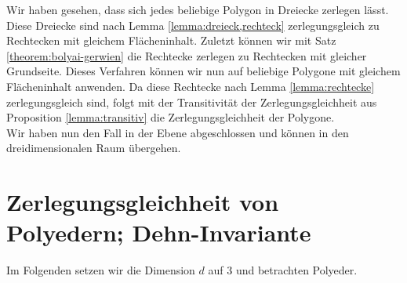 \documentclass[11pt,titlepage]{article}
\theoremstyle{definition}
\theoremstyle{remark}
\begin{document}
	Wir haben gesehen, dass sich jedes beliebige Polygon in Dreiecke zerlegen lässt. Diese Dreiecke 
	sind nach Lemma \ref{lemma:dreieck,rechteck} zerlegungsgleich zu Rechtecken mit gleichem 
	Flächeninhalt. Zuletzt können wir mit Satz \ref{theorem:bolyai-gerwien} die Rechtecke zerlegen zu Rechtecken 
	mit gleicher Grundseite. Dieses Verfahren können wir nun auf beliebige Polygone mit gleichem Flächeninhalt 
	anwenden. Da diese Rechtecke nach Lemma \ref{lemma:rechtecke} zerlegungsgleich sind, folgt mit der 
	Transitivität der Zerlegungsgleichheit aus Proposition \ref{lemma:transitiv} die Zerlegungsgleichheit der Polygone. \\
	Wir haben nun den Fall in der Ebene abgeschlossen und können in 
	den dreidimensionalen Raum übergehen. 
	
	\newpage
	
	\section{Zerlegungsgleichheit von Polyedern; Dehn-Invariante}
	
	Im Folgenden setzen wir die Dimension $d$ auf $3$ und betrachten Polyeder. 
	
\end{document}
